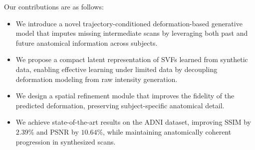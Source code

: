 \vspace{0.5em}

Our contributions are as follows:
\begin{itemize}
    \item We introduce a novel trajectory-conditioned deformation-based generative model that imputes missing intermediate scans by leveraging both past and future anatomical information across subjects.
    \item We propose a compact latent representation of SVFs learned from synthetic data, enabling effective learning under limited data by decoupling deformation modeling from raw intensity generation.
    \item We design a spatial refinement module that improves the fidelity of the predicted deformation, preserving subject-specific anatomical detail.
    \item We achieve state-of-the-art results on the ADNI dataset, improving SSIM by $2.39\%$ and PSNR by $10.64\%$, while maintaining anatomically coherent progression in synthesized scans.
\end{itemize}







